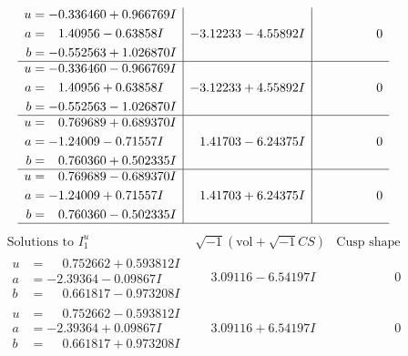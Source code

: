 \documentclass[1p]{elsarticle_modified}
\theoremstyle{definition}
\newcommand{\I}{\sqrt{-1}}
\begin{document}
$$\begin{array}{c|c|c}
\begin{aligned}
u &= -0.336460 + 0.966769 I \\
a &= \phantom{-}1.40956 - 0.63858 I \\
b &= -0.552563 + 1.026870 I\end{aligned}
 & -3.12233 - 4.55892 I & \phantom{-0.000000 } 0 \\ \hline\begin{aligned}
u &= -0.336460 - 0.966769 I \\
a &= \phantom{-}1.40956 + 0.63858 I \\
b &= -0.552563 - 1.026870 I\end{aligned}
 & -3.12233 + 4.55892 I & \phantom{-0.000000 } 0 \\ \hline\begin{aligned}
u &= \phantom{-}0.769689 + 0.689370 I \\
a &= -1.24009 - 0.71557 I \\
b &= \phantom{-}0.760360 + 0.502335 I\end{aligned}
 & \phantom{-}1.41703 - 6.24375 I & \phantom{-0.000000 } 0 \\ \hline\begin{aligned}
u &= \phantom{-}0.769689 - 0.689370 I \\
a &= -1.24009 + 0.71557 I \\
b &= \phantom{-}0.760360 - 0.502335 I\end{aligned}
 & \phantom{-}1.41703 + 6.24375 I & \phantom{-0.000000 } 0\\
 \hline 
 \end{array}$$\newpage$$\begin{array}{c|c|c}  
\text{Solutions to }I^u_{1}& \I (\text{vol} + \sqrt{-1}CS) & \text{Cusp shape}\\
 \hline 
\begin{aligned}
u &= \phantom{-}0.752662 + 0.593812 I \\
a &= -2.39364 - 0.09867 I \\
b &= \phantom{-}0.661817 - 0.973208 I\end{aligned}
 & \phantom{-}3.09116 - 6.54197 I & \phantom{-0.000000 } 0 \\ \hline\begin{aligned}
u &= \phantom{-}0.752662 - 0.593812 I \\
a &= -2.39364 + 0.09867 I \\
b &= \phantom{-}0.661817 + 0.973208 I\end{aligned}
 & \phantom{-}3.09116 + 6.54197 I & \phantom{-0.000000 } 0 \\ \hline\begin{aligned}

\end{aligned}
\end{array}$$
\end{document}
